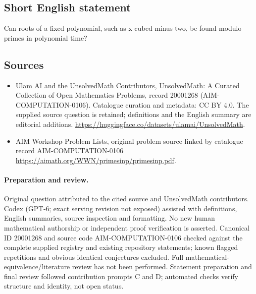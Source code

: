 \documentclass[11pt]{article}
\begin{document}
\subsection{Short English statement}
Can roots of a fixed polynomial, such as x cubed minus two, be found modulo primes in polynomial time?
\subsection{Sources}
\begin{itemize}
\item[\hypertarget{source:20001268:1}{S1}] Ulam AI and the UnsolvedMath Contributors, UnsolvedMath: A Curated Collection of Open Mathematics Problems, record 20001268 (AIM-COMPUTATION-0106). Catalogue curation and metadata: CC BY 4.0. The supplied source question is retained; definitions and the English summary are editorial additions.
\url{https://huggingface.co/datasets/ulamai/UnsolvedMath}.
\item[\hypertarget{source:20001268:2}{S2}] AIM Workshop Problem Lists, original problem source linked by catalogue record AIM-COMPUTATION-0106
\url{https://aimath.org/WWN/primesinp/primesinp.pdf}.
\end{itemize}
\paragraph{Preparation and review.}
Original question attributed to the cited source and UnsolvedMath contributors. Codex (GPT-6; exact serving revision not exposed) assisted with definitions, English summaries, source inspection and formatting. No new human mathematical authorship or independent proof verification is asserted. Canonical ID 20001268 and source code AIM-COMPUTATION-0106 checked against the complete supplied registry and existing repository statements; known flagged repetitions and obvious identical conjectures excluded. Full mathematical-equivalence/literature review has not been performed. Statement preparation and final review followed contribution prompts C and D; automated checks verify structure and identity, not open status.
\label{end:20001268}
\end{document}
